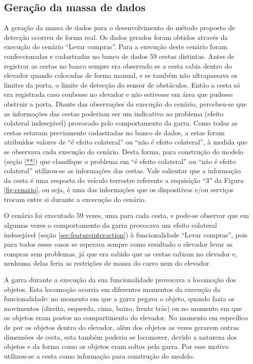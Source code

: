 \subsection{Geração da massa de dados}
A geração da massa de dados para o desenvolvimento do método proposto de detecção ocorreu de forma real. Os dados gerados foram obtidos através da execução do cenário ``Levar compras''. Para a execução deste cenário foram confeccionadas e cadastradas no banco de dados 59 cestas distintas. Antes de registrar as cestas no banco sempre era observado se a cesta cabia dentro do elevador quando colocadas de forma manual, e se também não ultrapassava os limites da porta, o limite de detecção do sensor de obstáculos. Então a cesta só era registrada caso coubesse no elevador e não estivesse em área que pudesse obstruir a porta. Diante das observações da execução do cenário, percebeu-se que as informações das cestas poderiam ser um indicativo ao problema (efeito colateral indesejável) provocado pelo comportamento da garra. Como todas as cestas estavam previamente cadastradas no banco de dados, a estas foram atribuídos valores de ``é efeito colateral'' ou ``não é efeito colateral'', à medida que se observava cada execução do cenário. Desta forma, para construção do modelo (seção \ref{**}) que classifique o problema em ``é efeito colateral'' ou ``não é efeito colateral'' utilizou-se as informações das cestas. Vale salientar que a informação da cesta é uma resposta do veículo terrestre referente a requisição ``3'' da Figura \ref{fig:cenario}, ou seja, é uma das informações que os dispositivos e/ou serviços trocam entre si durante a excecução do cenário.

O cenário foi executado 59 vezes, uma para cada cesta, e pode-se observar que em algumas vezes o comportamento da garra provocava um efeito colateral indesejável (seção \ref{sec:featureinteraction}) à funcionalidade ``Levar compras'', pois para todos esses casos se esperava sempre como resultado o elevador levar as compras sem problemas, já que era sabido que as cestas cabiam no elevador e, nenhuma delas feria as restrições de massa do carro nem do elevador. 

A garra durante a execução da sua funcionalidade provocava a locomoção dos objetos. Esta locomoção ocorria em diferentes momentos da execução da funcionalidade: no momento em que a garra pegava o objeto, quando fazia os movimentos (direita, esquerda, cima, baixo, frente trás) ou no momento em que os objetos eram postos no compartimento do elevador. No momento em específico de por os objetos dentro do elevador, além dos objetos as vezes gerarem outras dimensões de cesta, esta também poderia se locomover, devido a natureza dos objetos e da forma como os objetos eram soltos pela garra. Por esse motivo utilizou-se a cesta como informação para construção do modelo.

